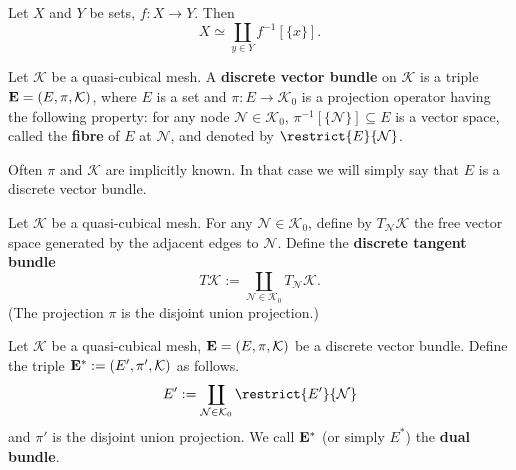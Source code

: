 \begin{proposition}
  Let $X$ and $Y$ be sets, $f \colon X \to Y$.
  Then
  \begin{equation}
    X \simeq \coprod_{y \in Y} f^{-1}[\{x\}].
  \end{equation}
\end{proposition}
\begin{definition}
  Let $\mathcal{K}$ be a quasi-cubical mesh.
  A \textbf{discrete vector bundle} on $\mathcal{K}$ is a triple
  ${\bf E} = (E, \pi, \mathcal{K})$,
  where $E$ is a set and $\pi \colon E \to \mathcal{K}_0$ is a projection
  operator having the following property:
  for any node $\mathcal{N} \in \mathcal{K}_0$,
  $\pi^{-1}[\{\mathcal{N}\}] \subseteq E$ is a vector space, called the
  \textbf{fibre} of $E$ at $\mathcal{N}$,
  and denoted by $\restrict{E}{\mathcal{N}}$.

  Often $\pi$ and $\mathcal{K}$ are implicitly known.
  In that case we will simply say that $E$ is a discrete vector bundle.
\end{definition}
\begin{example}
  Let $\mathcal{K}$ be a quasi-cubical mesh.
  For any $\mathcal{N} \in \mathcal{K}_0$, define by $T_\mathcal{N} \mathcal{K}$
  the free vector space generated by the adjacent edges to $\mathcal{N}$.
  Define the \textbf{discrete tangent bundle}
  \begin{equation}
    T \mathcal{K}
    := \coprod_{\mathcal{N} \in \mathcal{K}_0} T_\mathcal{N} \mathcal{K}.
  \end{equation}
  (The projection $\pi$ is the disjoint union projection.)
\end{example}
\begin{definition}
  Let $\mathcal{K}$ be a quasi-cubical mesh,
  ${\bf E} = (E, \pi, \mathcal{K})$ be a discrete vector bundle.
  Define the triple ${\bf E}^* := (E', \pi', \mathcal{K})$ as follows.
  \begin{equation}
    E' := \coprod_{\mathcal{N} \in \mathcal{K}_0} \restrict{E'}{\mathcal{N}}
  \end{equation}
  and $\pi'$ is the disjoint union projection.
  We call ${\bf E}^*$  (or simply $E^*$) the \textbf{dual bundle}.
\end{definition}
